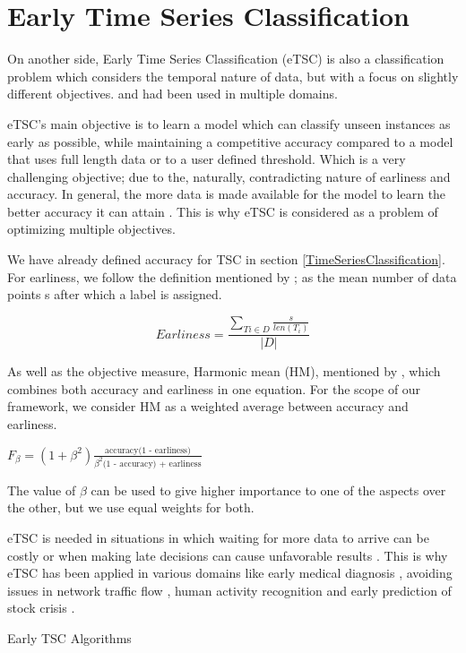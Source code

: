 \section{Early Time Series Classification}
\label{EarlyTimeSeriesClassification}
On another side, Early Time Series Classification (eTSC) is also a classification problem which considers the temporal nature of data,
but with a focus on slightly different objectives.  and had been used in multiple domains.

eTSC's main objective is to learn a model which can classify unseen instances as early as possible,
while maintaining a competitive accuracy compared to a model that uses full length data or to a user defined threshold\cite{xing2009early}.
Which is a very challenging objective; due to the, naturally, contradicting nature of earliness and accuracy.
In general, the more data is made available for the model to learn the better accuracy it can attain \cite{mori2019early,tavenard2016cost,xing2012early,mori2017reliable}.
This is why eTSC is considered as a problem of optimizing multiple objectives.

We have already defined accuracy for TSC in section \ref{TimeSeriesClassification}.
For earliness, we follow the definition mentioned by \cite{schafer2020teaser}; as the mean number of data points s after which a label is assigned.
\begin{definition}
    \[ \textstyle Earliness = \frac{\sum_{T{i}\in D}\frac{s}{len(T_{i})}}{|D|} \]
\end{definition}
As well as the objective measure, Harmonic mean (HM), mentioned by \cite{ghalwash2012early,schafer2020teaser}, which combines both accuracy and earliness in one equation.
For the scope of our framework, we consider HM as a weighted average between accuracy and earliness.
\begin{definition}
    $F_{\beta} = (1 + \beta^2)\frac{\text{accuracy(1 - earliness)}}{\beta^2 \text{(1 - accuracy) + earliness}}$
\end{definition}
The value of $\beta$ can be used to give higher importance to one of the aspects over the other, but we use equal weights for both.

eTSC is needed in situations in which waiting for more data to arrive can be costly or
when making late decisions can cause unfavorable results \cite{mori2017early,parrish2013classifying,lin2015reliable}.
This is why eTSC has been applied in various domains like early medical diagnosis \cite{griffin2001toward,ghalwash2012early},
avoiding issues in network traffic flow \cite{bernaille2006traffic}, human activity recognition \cite{yazdanbakhsh2019multivariate,gupta2020fault}
and early prediction of stock crisis \cite{ghalwash2014utilizing}.

{Early TSC Algorithms}